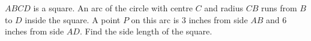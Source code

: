 $ABCD$ is a square. An arc of the circle with centre $C$ and radius $CB$ runs from $B$ to $D$ inside the square. A point $P$ on this arc is $3$ inches from side $AB$ and $6$ inches from side $AD$. Find the side length of the square.
